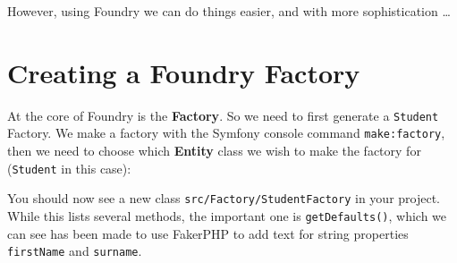 \documentclass[a4paperpaper,openright]{book}
\newenvironment{Shaded}{}{}
\newcommand{\ExtensionTok}[1]{#1}
\newcommand{\NormalTok}[1]{#1}
\newcommand{\OperatorTok}[1]{\textcolor[rgb]{0.40,0.40,0.40}{#1}}
\begin{document}
However, using Foundry we can do things easier, and with more
sophistication \ldots{}

\hypertarget{creating-a-foundry-factory}{%
\section{Creating a Foundry Factory}\label{creating-a-foundry-factory}}

At the core of Foundry is the \textbf{Factory}. So we need to first
generate a \texttt{Student} Factory. We make a factory with the Symfony
console command \texttt{make:factory}, then we need to choose which
\textbf{Entity} class we wish to make the factory for (\texttt{Student}
in this case):

\begin{Shaded}
\end{Shaded}

You should now see a new class \texttt{src/Factory/StudentFactory} in
your project. While this lists several methods, the important one is
\texttt{getDefaults()}, which we can see has been made to use FakerPHP
to add text for string properties \texttt{firstName} and
\texttt{surname}.
\end{document}
